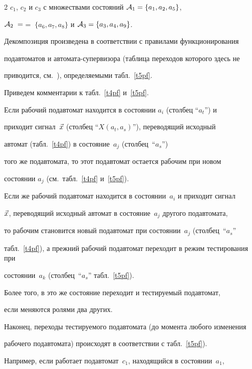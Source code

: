 \begin{multicols}{2}
$c_1$, $c_2$ и $c_3$ с множествами состояний ${\cal A}_1 = \{a_1,a_2,a_5\}$,\


${\cal A}_2\; =$\linebreak $=\; \{a_6,a_7,a_8\}$ и ${\cal A}_3 = \{a_3,a_4,a_9\}$.


Декомпозиция произведена в соответствии с правилами функционирования


подавтоматов и автомата-супервизора (таблица переходов которого здесь не


приводится, см.~\cite{6}), определяемыми табл.~\ref{t5pf}.








Приведем комментарии к табл.~\ref{t4pf} и~\ref{t5pf}.





Если рабочий подавтомат находится в состоянии $a_i$ (столбец ``$a_t$'') и


приходит сигнал~$\vec x$ (столбец ``$X(a_t,a_s)$''), переводящий исходный


автомат (табл.~\ref{t4pf}) в со\-сто\-яние~$a_j$ (столбец~``$a_s$'')


того же под\-ав\-то\-ма\-та, то этот подавтомат остается рабочим при новом


состоянии $a_j$ (см.\ табл.~\ref{t4pf} и~\ref{t5pf}).


Если же рабочий подавтомат находится в со\-сто\-янии~$a_i$ и приходит сигнал


$\vec x$, переводящий исходный автомат в со\-сто\-яние~$a_j$ другого подавтомата,


то рабочим становится новый подавтомат при со\-сто\-янии~$a_j$ (столбец~``$a_s$''


табл.~\ref{t4pf}), а прежний рабочий подавтомат переходит в режим тестирования при


со\-сто\-янии~$a_k$ (столбец~``$a_s$'' табл.~\ref{t5pf}).


Более того, в это же состояние переходит и тестируемый подавтомат,


если меняются ролями два других.


Наконец, переходы тестируемого подавтомата (до момента любого изменения


рабочего подавтомата) происходят в соответствии с табл.~\ref{t5pf}).








Например, если работает подавтомат~$c_1$, находящийся в со\-сто\-янии~$a_1$,



\end{multicols}
